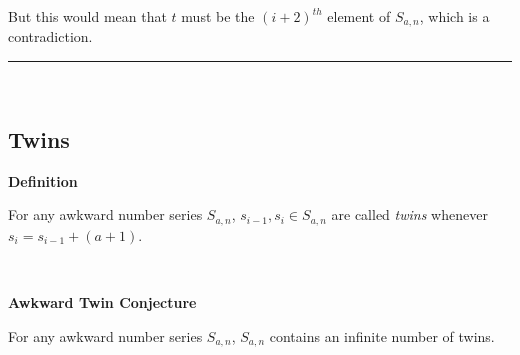 \documentclass[a4paper,12pt]{article}
\begin{document}
\noindent But this would mean that $t$ must be the $(i + 2)^{th}$ element of $S_{a, n}$, which is a contradiction.


\begin{center}
\noindent\rule{8cm}{0.4pt}
\end{center}
\noindent \\






\subsection{Twins}
\label{subsection:twins}





\label{definition:twins}
\hypertarget{definition:twins}{}
\begin{tcolorbox}
\textbf{Definition}

For any awkward number series $S_{a,n}$, $s_{i - 1}, s_i \in S_{a,n}$ are called \textit{twins} whenever $s_i = s_{i - 1} + (a + 1)$.

\end{tcolorbox}
\noindent \\










\label{conjecture:twin_conjecture}
\hypertarget{conjecture:twin_conjecture}{}
\begin{tcolorbox}
\textbf{Awkward Twin Conjecture}

For any awkward number series $S_{a,n}$, $S_{a, n}$ contains an infinite number of twins.

\end{tcolorbox}
\noindent \\
\end{document}
